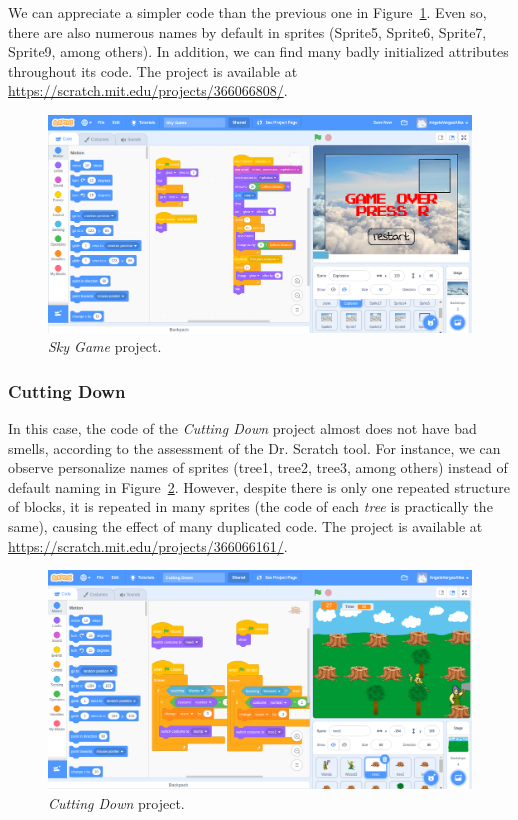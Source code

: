 We can appreciate a simpler code than the previous one in Figure~\ref{fig:sky_game}. Even so, there are also numerous names by default in sprites (Sprite5, Sprite6, Sprite7, Sprite9, among others). In addition, we can find many badly initialized attributes throughout its code. The project is available at \url{https://scratch.mit.edu/projects/366066808/}.

 \begin{figure}
    \centering
    \includegraphics[width=13cm,                         keepaspectratio]{img/sky_game.png}
    \caption{\textit{Sky Game} project.}
    \label{fig:sky_game}
\end{figure}

\subsubsection{Cutting Down}
\label{subsubsec:cutting_down}

In this case, the code of the \textit{Cutting Down} project almost does not have bad smells, according to the assessment of the Dr. Scratch tool. For instance, we can observe personalize names of sprites (tree1, tree2, tree3, among others) instead of default naming in Figure~\ref{fig:cutting_down}. However, despite there is only one repeated structure of blocks, it is repeated in many sprites (the code of each \textit{tree} is practically the same), causing the effect of many duplicated code. The project is available at \url{https://scratch.mit.edu/projects/366066161/}.

 \begin{figure}
    \centering
    \includegraphics[width=13cm,                         keepaspectratio]{img/cutting_down.png}
    \caption{\textit{Cutting Down} project.}
    \label{fig:cutting_down}
\end{figure}

